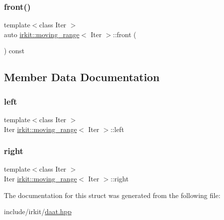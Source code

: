 \mbox{\label{structirkit_1_1moving__range_ad9b6b752c32f19fdbfe2dfa607ea4fc3}} 
\subsubsection{\texorpdfstring{front()}{front()}}
{\footnotesize\ttfamily template$<$class Iter $>$ \\
auto \hyperlink{structirkit_1_1moving__range}{irkit\+::moving\+\_\+range}$<$ Iter $>$\+::front (\begin{DoxyParamCaption}{ }\end{DoxyParamCaption}) const\hspace{0.3cm}{\ttfamily [inline]}}



\subsection{Member Data Documentation}
\mbox{\label{structirkit_1_1moving__range_a175a0bc6996715ea27e6b87abff03139}} 
\subsubsection{\texorpdfstring{left}{left}}
{\footnotesize\ttfamily template$<$class Iter $>$ \\
Iter \hyperlink{structirkit_1_1moving__range}{irkit\+::moving\+\_\+range}$<$ Iter $>$\+::left}

\mbox{\label{structirkit_1_1moving__range_aa64b16b98bdd7b627ecceb82c8ef3bec}} 
\subsubsection{\texorpdfstring{right}{right}}
{\footnotesize\ttfamily template$<$class Iter $>$ \\
Iter \hyperlink{structirkit_1_1moving__range}{irkit\+::moving\+\_\+range}$<$ Iter $>$\+::right}



The documentation for this struct was generated from the following file\+:\begin{DoxyCompactItemize}
\item 
include/irkit/\hyperlink{daat_8hpp}{daat.\+hpp}\end{DoxyCompactItemize}

